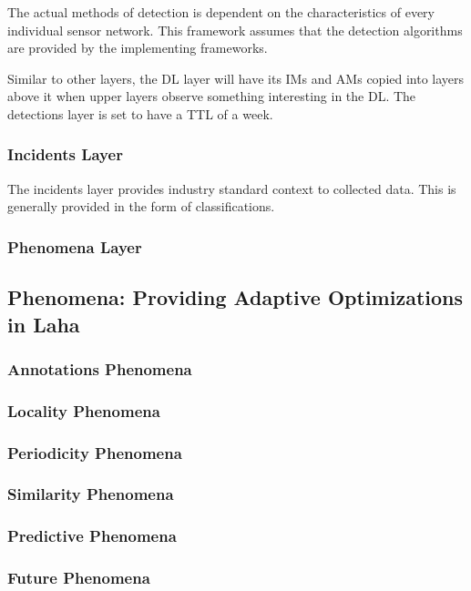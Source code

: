The actual methods of detection is dependent on the characteristics of every individual sensor network. This framework assumes that the detection algorithms are provided by the implementing frameworks.

Similar to other layers, the DL layer will have its IMs and AMs copied into layers above it when upper layers observe something interesting in the DL. The detections layer is set to have a TTL of a week.

\subsubsection{Incidents Layer}
The incidents layer provides industry standard context to collected data. This is generally provided in the form of classifications.

\subsubsection{Phenomena Layer}

\subsection{Phenomena: Providing Adaptive Optimizations in Laha} \label{phenomena}

\subsubsection{Annotations Phenomena} \label{annotations-phenomena}

\subsubsection{Locality Phenomena} \label{locality-phenomena}

\subsubsection{Periodicity Phenomena} \label{periodicity-phenomena}

\subsubsection{Similarity Phenomena}

\subsubsection{Predictive Phenomena}

\subsubsection{Future Phenomena}
